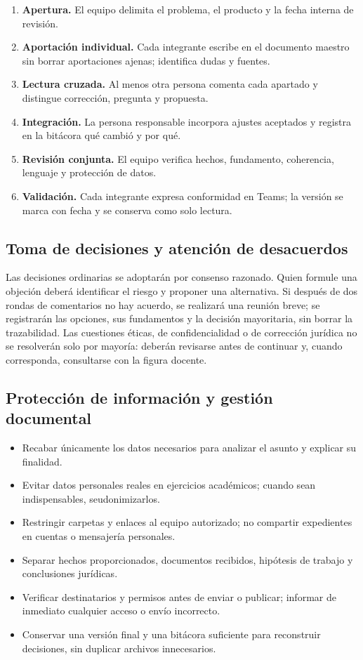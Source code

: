 \documentclass[
  spanish,
  letterpaper, oneside
]{article}
\begin{document}
\begin{enumerate}
  \item \textbf{Apertura.} El equipo delimita el problema, el producto y la fecha interna de revisión.
  \item \textbf{Aportación individual.} Cada integrante escribe en el documento maestro sin borrar aportaciones ajenas; identifica dudas y fuentes.
  \item \textbf{Lectura cruzada.} Al menos otra persona comenta cada apartado y distingue corrección, pregunta y propuesta.
  \item \textbf{Integración.} La persona responsable incorpora ajustes aceptados y registra en la bitácora qué cambió y por qué.
  \item \textbf{Revisión conjunta.} El equipo verifica hechos, fundamento, coherencia, lenguaje y protección de datos.
  \item \textbf{Validación.} Cada integrante expresa conformidad en Teams; la versión se marca con fecha y se conserva como solo lectura.
\end{enumerate}

\subsection{Toma de decisiones y atención de desacuerdos}

Las decisiones ordinarias se adoptarán por consenso razonado. Quien formule una
objeción deberá identificar el riesgo y proponer una alternativa. Si después de dos
rondas de comentarios no hay acuerdo, se realizará una reunión breve; se registrarán
las opciones, sus fundamentos y la decisión mayoritaria, sin borrar la trazabilidad.
Las cuestiones éticas, de confidencialidad o de corrección jurídica no se resolverán
solo por mayoría: deberán revisarse antes de continuar y, cuando corresponda,
consultarse con la figura docente.

\subsection{Protección de información y gestión documental}

\begin{itemize}
  \item Recabar únicamente los datos necesarios para analizar el asunto y explicar su finalidad.
  \item Evitar datos personales reales en ejercicios académicos; cuando sean indispensables, seudonimizarlos.
  \item Restringir carpetas y enlaces al equipo autorizado; no compartir expedientes en cuentas o mensajería personales.
  \item Separar hechos proporcionados, documentos recibidos, hipótesis de trabajo y conclusiones jurídicas.
  \item Verificar destinatarios y permisos antes de enviar o publicar; informar de inmediato cualquier acceso o envío incorrecto.
  \item Conservar una versión final y una bitácora suficiente para reconstruir decisiones, sin duplicar archivos innecesarios.
\end{itemize}
\end{document}
